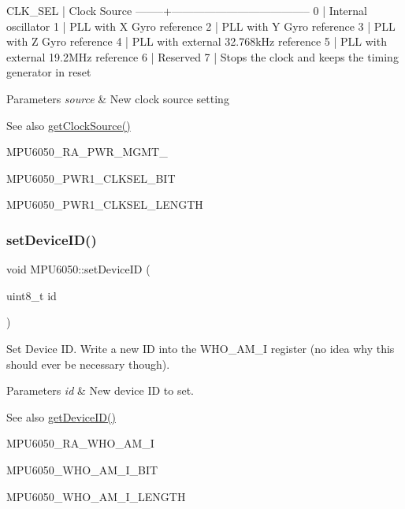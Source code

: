 \begin{DoxyPre}
CLK\_SEL | Clock Source
--------+--------------------------------------
0       | Internal oscillator
1       | PLL with X Gyro reference
2       | PLL with Y Gyro reference
3       | PLL with Z Gyro reference
4       | PLL with external 32.768kHz reference
5       | PLL with external 19.2MHz reference
6       | Reserved
7       | Stops the clock and keeps the timing generator in reset
\end{DoxyPre}



\begin{DoxyParams}{Parameters}
{\em source} & New clock source setting \\
\hline
\end{DoxyParams}
\begin{DoxySeeAlso}{See also}
\mbox{\hyperlink{class_m_p_u6050_a8ed670258a805807b5102cdc5d0996a8}{get\+Clock\+Source()}} 

M\+P\+U6050\+\_\+\+R\+A\+\_\+\+P\+W\+R\+\_\+\+M\+G\+M\+T\+\_ 

M\+P\+U6050\+\_\+\+P\+W\+R1\+\_\+\+C\+L\+K\+S\+E\+L\+\_\+\+B\+IT 

M\+P\+U6050\+\_\+\+P\+W\+R1\+\_\+\+C\+L\+K\+S\+E\+L\+\_\+\+L\+E\+N\+G\+TH 
\end{DoxySeeAlso}
\mbox{\label{class_m_p_u6050_aaefb4b3d93cf4b78d56cd63b10ea0e97}} 
\subsubsection{\texorpdfstring{setDeviceID()}{setDeviceID()}}
{\footnotesize\ttfamily void M\+P\+U6050\+::set\+Device\+ID (\begin{DoxyParamCaption}\item[{uint8\+\_\+t}]{id }\end{DoxyParamCaption})}

Set Device ID. Write a new ID into the W\+H\+O\+\_\+\+A\+M\+\_\+I register (no idea why this should ever be necessary though). 
\begin{DoxyParams}{Parameters}
{\em id} & New device ID to set. \\
\hline
\end{DoxyParams}
\begin{DoxySeeAlso}{See also}
\mbox{\hyperlink{class_m_p_u6050_a35ae3c8894b3258e642043886801e031}{get\+Device\+I\+D()}} 

M\+P\+U6050\+\_\+\+R\+A\+\_\+\+W\+H\+O\+\_\+\+A\+M\+\_\+I 

M\+P\+U6050\+\_\+\+W\+H\+O\+\_\+\+A\+M\+\_\+\+I\+\_\+\+B\+IT 

M\+P\+U6050\+\_\+\+W\+H\+O\+\_\+\+A\+M\+\_\+\+I\+\_\+\+L\+E\+N\+G\+TH 
\end{DoxySeeAlso}
\mbox{\label{class_m_p_u6050_a44cc43aaad1e52c1ba3142d4490af611}} 
